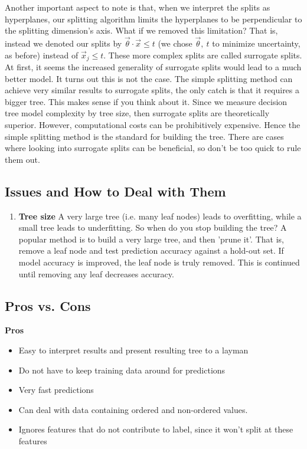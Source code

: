\documentclass[10pt]{article}
\begin{document}
		Another important aspect to note is that, when we interpret the splits as hyperplanes, our splitting algorithm
		limits the hyperplanes to be perpendicular to the splitting dimension's axis. What if we removed this limitation?
		That is, instead we denoted our splits by $\vec \theta \cdot \vec x \leq t$ (we chose $\vec \theta, \ t $ to minimize
		uncertainty, as before) instead of $\vec x_j \leq t$. These more complex splits are called surrogate splits. 
		At first, it seems the increased generality of surrogate splits would lead to a much better model. It turns out 
		this is not the case. The simple splitting method can achieve very similar results to surrogate splits, 
		the only catch is that it requires a bigger tree. This makes sense if you think about it. Since
		we measure decision tree model complexity by tree size, then surrogate splits are theoretically 
		superior. However, computational costs can be prohibitively expensive. Hence the simple splitting method is
		the standard for building the tree. There are cases where looking into surrogate splits can be beneficial, so 
		don't be too quick to rule them out. 
	
	\subsection*{Issues and How to Deal with Them}
		\begin{enumerate}
			\item \textbf{Tree size} A very large tree (i.e. many leaf nodes) leads to overfitting, while a small tree
			leads to underfitting. So when do you stop building the tree? A popular method is to build a very large tree, 
			and then 'prune it'. That is, remove a leaf node and test prediction accuracy against a hold-out set. 
			If model accuracy is improved, the leaf node is truly removed. This is continued until removing any leaf 
			decreases accuracy. 
		\end{enumerate}
	\subsection*{Pros vs. Cons}
		\textbf{Pros}
		\begin{itemize}
			\item Easy to interpret results and present resulting tree to a layman
			\item Do not have to keep training data around for predictions
			\item Very fast predictions
			\item Can deal with data containing ordered and non-ordered values.
			\item Ignores features that do not contribute to label, since it won't split at these features
		\end{itemize}
	
\end{document}
